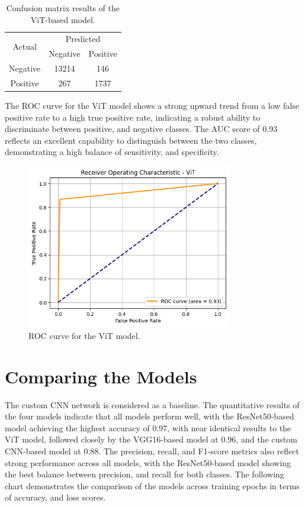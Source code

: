 \documentclass[../main]{subfiles}
\begin{document}
\begin{table}[h!]
    \centering
    \begin{tabular}{|c|c|c|}
        \hline
        \multirow{2}{*}{Actual} & \multicolumn{2}{c|}{Predicted} \\ \cline{2-3}
                                & Negative         & Positive         \\ \hline
        Negative                & 13214            & 146              \\ \hline
        Positive                & 267              & 1737              \\ \hline
    \end{tabular}
    \caption{Confusion matrix results of the ViT-based model.}
    \label{tab:confusion-matrix-vit}
\end{table}

\noindent The ROC curve for the ViT model shows a strong upward trend from a low false positive rate to a high true positive rate, indicating a robust ability to discriminate between positive, and negative classes. The AUC score of 0.93 reflects an excellent capability to distinguish between the two classes, demonstrating a high balance of sensitivity, and specificity.

\begin{figure}[h!]
	\centering
	\includegraphics[width=0.8\textwidth]{assets/roc_vit.png}
	\caption{ROC curve for the ViT model.}
    \label{fig:roc-vit}
\end{figure}

\clearpage

\section{Comparing the Models}
\label{sec:comparing-models}
The custom CNN network is considered as a baseline. The quantitative results of the four models indicate that all models perform well, with the ResNet50-based model achieving the highest accuracy of 0.97, with near identical results to the ViT model, followed closely by the VGG16-based model at 0.96, and the custom CNN-based model at 0.88. The precision, recall, and F1-score metrics also reflect strong performance across all models, with the ResNet50-based model showing the best balance between precision, and recall for both classes. The following chart demonstrates the comparison of the models across training epochs in terms of accuracy, and loss scores.
\end{document}

